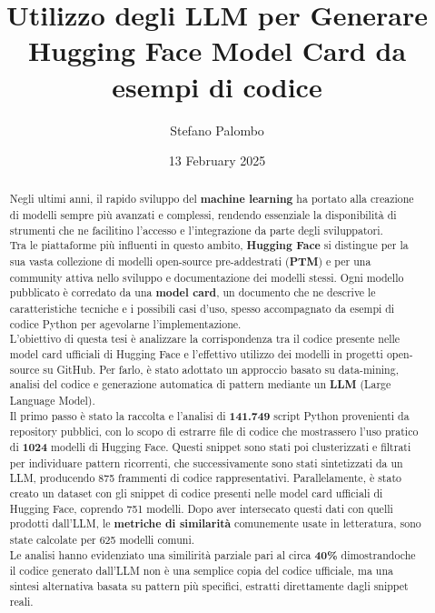 \documentclass{article}
\title{Utilizzo degli LLM per Generare Hugging Face Model Card da esempi di codice}
\author{Stefano Palombo}
\date{13 February 2025}
\begin{document}
\maketitle

\begin{abstract}
Negli ultimi anni, il rapido sviluppo del \textbf{machine learning} ha portato alla creazione di modelli sempre più avanzati e complessi, rendendo essenziale la disponibilità di strumenti che ne facilitino l’accesso e l’integrazione da parte degli sviluppatori.\\ 
Tra le piattaforme più influenti in questo ambito, \textbf{Hugging Face} si distingue per la sua vasta collezione di modelli open-source pre-addestrati (\textbf{PTM}) e per una community attiva nello sviluppo e documentazione dei modelli stessi. Ogni modello pubblicato è corredato da una \textbf{model card}, un documento che ne descrive le caratteristiche tecniche e i possibili casi d’uso, spesso accompagnato da esempi di codice Python per agevolarne l’implementazione.\\
L’obiettivo di questa tesi è analizzare la corrispondenza tra il codice presente nelle model card ufficiali di Hugging Face e l’effettivo utilizzo dei modelli in progetti open-source su GitHub. Per farlo, è stato adottato un approccio basato su data-mining, analisi del codice e generazione automatica di pattern mediante un \textbf{LLM} (Large Language Model).\\
Il primo passo è stato la raccolta e l’analisi di \textbf{141.749} script Python provenienti da repository pubblici, con lo scopo di estrarre file di codice che mostrassero l’uso pratico di \textbf{1024} modelli di Hugging Face. Questi snippet sono stati poi clusterizzati e filtrati per individuare pattern ricorrenti, che successivamente sono stati sintetizzati da un LLM, producendo 875 frammenti di codice rappresentativi. Parallelamente, è stato creato un dataset con gli snippet di codice presenti nelle model card ufficiali di Hugging Face, coprendo 751 modelli. Dopo aver intersecato questi dati con quelli prodotti dall’LLM, le \textbf{metriche di similarità} comunemente usate in letteratura, sono state calcolate per 625 modelli comuni.\\
Le analisi hanno evidenziato una similirità parziale pari al circa \textbf{40\%} dimostrandoche il codice generato dall’LLM non è una semplice copia del codice ufficiale, ma una sintesi alternativa basata su pattern più specifici, estratti direttamente dagli snippet reali.\\

\end{abstract}
\end{document}
